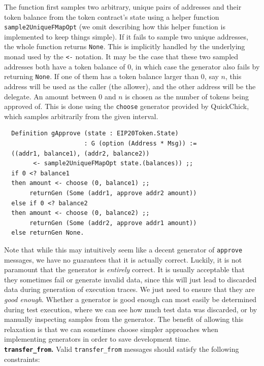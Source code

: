 \documentclass[twoside,11pt,openright]{report}
\newenvironment{code}{\captionsetup{type=figure, singlelinecheck=off, justification=raggedleft}}{}
\newcommand{\coq}[1]{\texttt{#1}}
\begin{document}
The function first samples two arbitrary, unique pairs of addresses and their token balance from the token contract's state using a helper function \coq{sample2UniqueFMapOpt} (we omit describing how this helper function is implemented to keep things simple). If it fails to sample two unique addresses, the whole function returns \coq{None}. This is implicitly handled by the underlying monad used by the \coq{<-} notation. It may be the case that these two sampled addresses both have a token balance of 0, in which case the generator also fails by returning \coq{None}. If one of them has a token balance larger than 0, say $n$, this address will be used as the caller (the allower), and the other address will be the delegate. An amount between $0$ and $n$ is chosen as the number of tokens being approved of. This is done using the \coq{choose} generator provided by QuickChick, which samples arbitrarily from the given interval.  
\begin{code}
\label{def:gApprove}
\begin{verbatim}
  Definition gApprove (state : EIP20Token.State) 
                      : G (option (Address * Msg)) :=
  ((addr1, balance1), (addr2, balance2)) 
	    <- sample2UniqueFMapOpt state.(balances)) ;;
  if 0 <? balance1
  then amount <- choose (0, balance1) ;; 
       returnGen (Some (addr1, approve addr2 amount))
  else if 0 <? balance2
  then amount <- choose (0, balance2) ;; 
       returnGen (Some (addr2, approve addr1 amount))
  else returnGen None.
\end{verbatim}
\end{code}
Note that while this may intuitively seem like a decent generator of \coq{approve} messages, we have no guarantees that it is actually correct. Luckily, it is not paramount that the generator is \textit{entirely} correct. It is usually acceptable that they sometimes fail or generate invalid data, since this will just lead to discarded data during generation of execution traces. We just need to ensure that they are \textit{good enough}. Whether a generator is good enough can most easily be determined during test execution, where we can see how much test data was discarded, or by manually inspecting samples from the generator. The benefit of allowing this relaxation is that we can sometimes choose simpler approaches when implementing generators in order to save development time. \medskip\\
\textbf{\coq{transfer\_from}.} Valid \coq{transfer\_from} messages should satisfy the following constraints:
\end{document}
